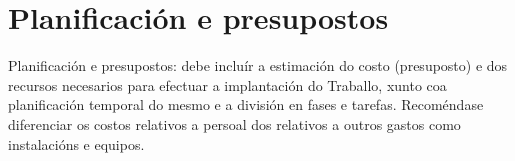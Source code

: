 \chapter{Planificación e presupostos}

Planificación e presupostos: debe incluír a estimación do costo (presuposto) e dos 
recursos necesarios para efectuar a implantación do Traballo, xunto coa planificación 
temporal do mesmo e a división en fases e tarefas. Recoméndase diferenciar os costos relativos a persoal dos relativos a outros gastos como instalacións e equipos.
